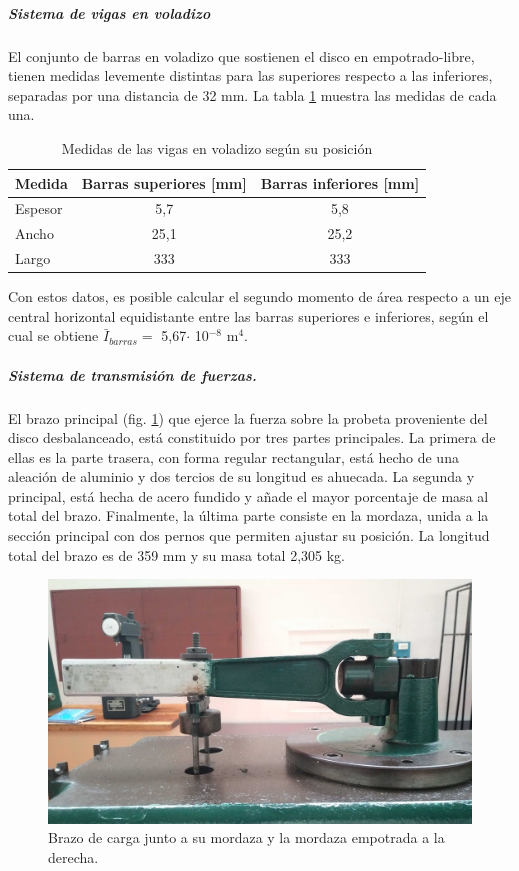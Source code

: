 \subparagraph{Sistema de vigas en voladizo}
El conjunto de barras en voladizo que sostienen el disco en empotrado-libre, tienen medidas levemente distintas para las superiores respecto a las inferiores, separadas por una distancia de 32 mm. La tabla \ref{tab:medidas_barrasacero} muestra las medidas de cada una.
\begin{table}[h]
\centering
\begin{tabular}{@{}lcc@{}}
\toprule
Medida  & Barras superiores {[}mm{]} & Barras inferiores {[}mm{]} \\ \midrule
Espesor      & 5,7                        & 5,8                        \\
Ancho        & 25,1                       & 25,2                       \\
Largo        & 333                        & 333                        \\ \bottomrule
\end{tabular}
\caption{Medidas de las vigas en voladizo según su posición}
\label{tab:medidas_barrasacero}
\end{table}

Con estos datos, es posible calcular el segundo momento de área respecto a un eje central horizontal equidistante entre las barras superiores e inferiores, según el cual se obtiene $\bar{I}_{barras}=$ 5,67$\cdot$ 10$^{-8} \text{ m}^4$. 

\subparagraph{Sistema de transmisión de fuerzas.}
El brazo principal (fig. \ref{fig:brazo_carga}) que ejerce la fuerza sobre la probeta proveniente del disco desbalanceado, está constituido por tres partes principales. La primera de ellas es la parte trasera, con forma regular rectangular, está hecho de una aleación de aluminio y dos tercios de su longitud es ahuecada. La segunda y principal, está hecha de acero fundido y añade el mayor porcentaje de masa al total del brazo. Finalmente, la última parte consiste en la mordaza, unida a la sección principal con dos pernos que permiten ajustar su posición. La longitud total del brazo es de 359 mm y su masa total 2,305 kg.

\begin{figure}[h]
\centering
\includegraphics[width=0.9\linewidth]{Imagenes/brazo_carga.jpg}
\caption{Brazo de carga junto a su mordaza y la mordaza empotrada a la derecha.}
\label{fig:brazo_carga}
\end{figure}

